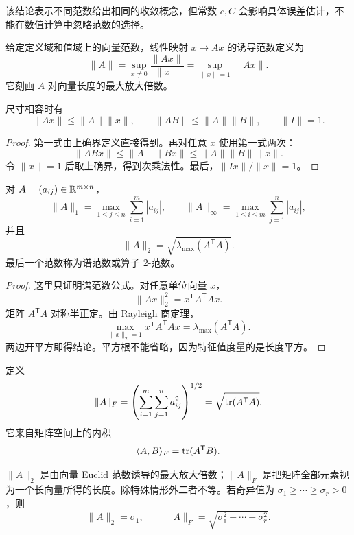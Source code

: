 该结论表示不同范数给出相同的收敛概念，但常数 $c,C$ 会影响具体误差估计，不能在数值计算中忽略范数的选择。

\begin{definition}[诱导矩阵范数]
给定定义域和值域上的向量范数，线性映射 $x\mapsto Ax$ 的诱导范数定义为
\[
\lVert A\rVert=\sup_{x\ne0}\frac{\lVert Ax\rVert}{\lVert x\rVert}
=\sup_{\lVert x\rVert=1}\lVert Ax\rVert.
\]
它刻画 $A$ 对向量长度的最大放大倍数。
\end{definition}

\begin{proposition}[诱导范数的基本性质]
尺寸相容时有
\[
\lVert Ax\rVert\le\lVert A\rVert\lVert x\rVert,
\qquad
\lVert AB\rVert\le\lVert A\rVert\lVert B\rVert,
\qquad
\lVert I\rVert=1.
\]
\end{proposition}
\begin{proof}
第一式由上确界定义直接得到。再对任意 $x$ 使用第一式两次：
\[
\lVert ABx\rVert\le\lVert A\rVert\lVert Bx\rVert
\le\lVert A\rVert\lVert B\rVert\lVert x\rVert.
\]
令 $\lVert x\rVert=1$ 后取上确界，得到次乘法性。最后，$\lVert Ix\rVert/\lVert x\rVert=1$。
\end{proof}

\begin{theorem}[常用诱导矩阵范数]
对 $A=(a_{ij})\in\mathbb{R}^{m\times n}$，
\[
\lVert A\rVert_1=\max_{1\le j\le n}\sum_{i=1}^m|a_{ij}|,
\qquad
\lVert A\rVert_\infty=\max_{1\le i\le m}\sum_{j=1}^n|a_{ij}|,
\]
并且
\[
\lVert A\rVert_2
=\sqrt{\lambda_{\max}(A^{\mathsf T}A)}.
\]
最后一个范数称为谱范数或算子 $2$-范数。
\end{theorem}
\begin{proof}
这里只证明谱范数公式。对任意单位向量 $x$，
\[
\lVert Ax\rVert_2^2=x^{\mathsf T}A^{\mathsf T}Ax.
\]
矩阵 $A^{\mathsf T}A$ 对称半正定。由 Rayleigh 商定理，
\[
\max_{\lVert x\rVert_2=1}x^{\mathsf T}A^{\mathsf T}Ax
=\lambda_{\max}(A^{\mathsf T}A).
\]
两边开平方即得结论。平方根不能省略，因为特征值度量的是长度平方。
\end{proof}

\begin{definition}[Frobenius 范数]
定义
\[
\lVert A\rVert_F
=\left(\sum_{i=1}^m\sum_{j=1}^na_{ij}^2\right)^{1/2}
=\sqrt{\operatorname{tr}(A^{\mathsf T}A)}.
\]
它来自矩阵空间上的内积
\[
\langle A,B\rangle_F=\operatorname{tr}(A^{\mathsf T}B).
\]
\end{definition}

\begin{pitfall}
$\lVert A\rVert_2$ 是由向量 Euclid 范数诱导的最大放大倍数；$\lVert A\rVert_F$ 是把矩阵全部元素视为一个长向量所得的长度。除特殊情形外二者不等。若奇异值为 $\sigma_1\ge\cdots\ge\sigma_r>0$，则
\[
\lVert A\rVert_2=\sigma_1,
\qquad
\lVert A\rVert_F=\sqrt{\sigma_1^2+\cdots+\sigma_r^2}.
\]
\end{pitfall}


